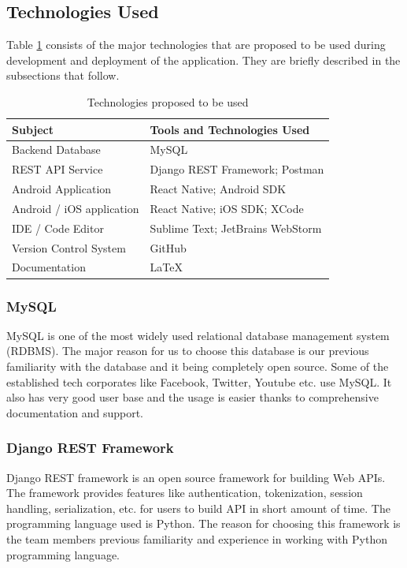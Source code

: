 \documentclass[12pt, a4paper, oneside]{article}
\begin{document}
\subsection{Technologies Used}
Table \ref{table:tech} consists of the major technologies that are proposed to be used during development and deployment of the application. They are briefly described in the subsections that follow.

\renewcommand{\arraystretch}{1.5}
\begin{table}[H]
\begin{tabular}{|l|l|}
\hline
\rowcolor[HTML]{C0C0C0} 
\textbf{Subject}    & \textbf{Tools and Technologies Used} \\ \hline
Backend Database            & MySQL                        \\ \hline
REST API Service    & Django REST Framework; Postman        \\ \hline
Android Application  & React Native; Android SDK                 \\ \hline
Android / iOS application  & React Native; iOS SDK; XCode              \\ \hline
IDE / Code Editor& Sublime Text; JetBrains WebStorm  \\ \hline
Version Control System& GitHub  \\ \hline
Documentation & LaTeX \\ \hline
\end{tabular}
\caption{Technologies proposed to be used}
\label{table:tech}
\end{table}

\subsubsection{MySQL}
MySQL is one of the most widely used relational database management system (RDBMS). The major reason for us to choose this database is our previous familiarity with the database and it being completely open source. Some of the established tech corporates like Facebook, Twitter, Youtube etc. use MySQL. It also has very good user base and the usage is easier thanks to comprehensive documentation and support.

\subsubsection{Django REST Framework}
Django REST framework is an open source framework for building Web APIs. The framework provides features like authentication, tokenization, session handling, serialization, etc. for users to build API in short amount of time. The programming language used is Python. The reason for choosing this framework is the team members previous familiarity and experience in working with Python programming language.
\end{document}

